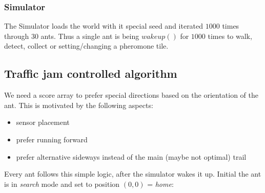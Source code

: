 \subsubsection{Simulator}\label{simulator}

The Simulator loads the world with it special seed and iterated \(1000\)
times through \(30\) ants. Thus a single ant is being \(wakeup()\) for
\(1000\) times to walk, detect, collect or setting/changing a pheromone
tile.

\subsection{Traffic jam controlled
algorithm}\label{traffic-jam-controlled-algorithm}

We need a score array to prefer special directions based on the
orientation of the ant. This is motivated by the following aspects:

\begin{itemize}
\tightlist
\item
  sensor placement
\item
  prefer running forward
\item
  prefer alternative sideways instead of the main (maybe not optimal)
  trail
\end{itemize}

Every ant follows this simple logic, after the simulator wakes it up.
Initial the ant is in \emph{search} mode and set to position \((0,0)\) =
\emph{home}:

